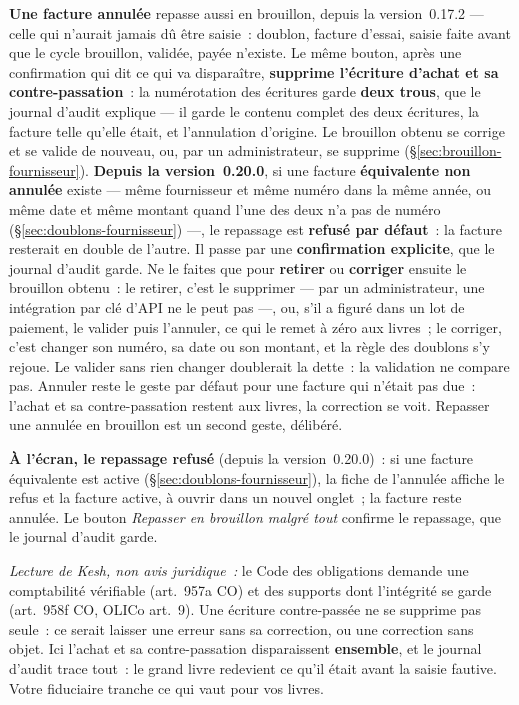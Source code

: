 \documentclass[a4paper,11pt,oneside]{article}
\begin{document}
\textbf{Une facture annulée} repasse aussi en brouillon, depuis la version~0.17.2 --- celle qui
n'aurait jamais dû être saisie~: doublon, facture d'essai, saisie faite avant que le cycle
brouillon, validée, payée n'existe. Le même bouton, après une confirmation qui dit ce qui va
disparaître, \textbf{supprime l'écriture d'achat et sa contre-passation}~: la numérotation des
écritures garde \textbf{deux trous}, que le journal d'audit explique --- il garde le contenu
complet des deux écritures, la facture telle qu'elle était, et l'annulation d'origine. Le
brouillon obtenu se corrige et se valide de nouveau, ou, par un administrateur, se supprime
(\S\ref{sec:brouillon-fournisseur}). \textbf{Depuis la version~0.20.0}, si une facture
\textbf{équivalente non annulée} existe --- même fournisseur et même numéro dans la même année,
ou même date et même montant quand l'une des deux n'a pas de numéro
(\S\ref{sec:doublons-fournisseur}) ---, le repassage est \textbf{refusé par défaut}~: la facture
resterait en double de l'autre. Il passe par une \textbf{confirmation explicite}, que le journal
d'audit garde. Ne le faites que pour \textbf{retirer} ou \textbf{corriger} ensuite le brouillon
obtenu~: le retirer, c'est le supprimer --- par un administrateur, une intégration par clé d'API
ne le peut pas ---, ou, s'il a figuré dans un lot de paiement, le valider puis l'annuler, ce qui
le remet à zéro aux livres~; le corriger, c'est changer son numéro, sa date ou son montant, et
la règle des doublons s'y rejoue. Le valider sans rien changer doublerait la dette~: la
validation ne compare pas. Annuler reste le geste par défaut pour une facture qui
n'était pas due~: l'achat et sa contre-passation restent aux livres, la correction se voit.
Repasser une annulée en brouillon est un second geste, délibéré.

\textbf{À l'écran, le repassage refusé} (depuis la version~0.20.0)~: si une facture équivalente
est active (\S\ref{sec:doublons-fournisseur}), la fiche de l'annulée affiche le refus et la
facture active, à ouvrir dans un nouvel onglet~; la facture reste annulée. Le bouton
\emph{Repasser en brouillon malgré tout} confirme le repassage, que le journal d'audit garde.

\emph{Lecture de Kesh, non avis juridique~:} le Code des obligations demande une comptabilité
vérifiable (art.~957a CO) et des supports dont l'intégrité se garde (art.~958f CO, OLICo
art.~9). Une écriture contre-passée ne se supprime pas seule~: ce serait laisser une erreur sans
sa correction, ou une correction sans objet. Ici l'achat et sa contre-passation disparaissent
\textbf{ensemble}, et le journal d'audit trace tout~: le grand livre redevient ce qu'il était
avant la saisie fautive. Votre fiduciaire tranche ce qui vaut pour vos livres.
\end{document}
